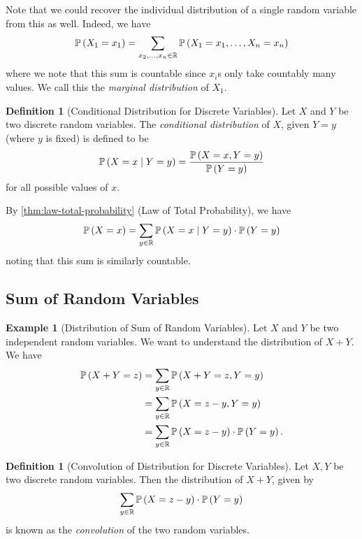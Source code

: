 \documentclass{article}
\theoremstyle{definition}
\newtheorem{definition}[theorem]{Definition}
\newtheorem{example}[theorem]{Example}
\theoremstyle{remark}
\newcommand{\RR}{\mathbb{R}}
\newcommand{\Prob}{\mathbb{P}}
\newcommand{\Conditional}[2]{#1\mid #2}
\begin{document}
Note that we could recover the individual distribution of a single random variable from this as well. Indeed, we have
\[
    \Prob\pqty{X_1 = x_1} = \sum_{x_2, \ldots, x_n \in \RR} \Prob\pqty{X_1 = x_1, \ldots, X_n = x_n}
\]
where we note that this sum is countable since \(x_i\)s only take countably many values. We call this the \emph{marginal distribution} of \(X_1\).

\begin{definition}[Conditional Distribution for Discrete Variables]
    \label{def:conditional-distribution-discrete}%
    Let \(X\) and \(Y\) be two discrete random variables. The \emph{conditional distribution} of \(X\), given \(Y = y\) (where \(y\) is fixed) is defined to be
    \[
        \Prob\pqty{\Conditional{X = x}{Y = y}} = \frac{\Prob\pqty{X = x, Y = y}}{\Prob\pqty{Y = y}}
    \]
    for all possible values of \(x\).
\end{definition}

By \autoref{thm:law-total-probability} (Law of Total Probability), we have
\[
    \Prob\pqty{X = x} = \sum_{y \in \RR} \Prob\pqty{\Conditional{X = x}{Y = y}} \cdot \Prob\pqty{Y = y}
\]
noting that this sum is similarly countable.

\subsection{Sum of Random Variables}

\begin{example}[Distribution of Sum of Random Variables]
    \label{ex:distribution-sum-discrete}%
    Let \(X\) and \(Y\) be two independent random variables. We want to understand the distribution of \(X + Y\). We have
    \begin{align*}
        \Prob\pqty{X + Y = z} &= \sum_{y \in \RR} \Prob\pqty{X + Y = z, Y = y} \\
        &= \sum_{y \in \RR} \Prob\pqty{X = z - y, Y = y} \\
        &= \sum_{y \in \RR} \Prob\pqty{X = z - y} \cdot \Prob\pqty{Y = y}.
    \end{align*}
\end{example}

\begin{definition}[Convolution of Distribution for Discrete Variables]
    \label{def:convolution-distribution-discrete}%
    Let \(X, Y\) be two discrete random variables. Then the distribution of \(X + Y\), given by
    \[
        \sum_{y \in \RR} \Prob\pqty{X = z - y} \cdot \Prob\pqty{Y = y}
    \]
    is known as the \emph{convolution} of the two random variables.
\end{definition}
\end{document}
